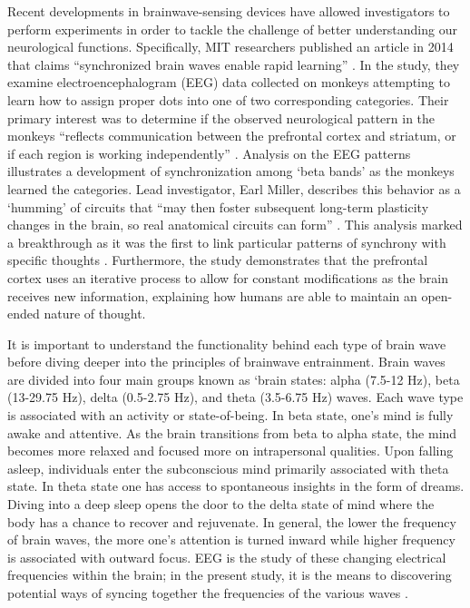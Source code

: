 \documentclass{article}[12pt]
\begin{document}
Recent developments in brainwave-sensing devices have allowed investigators to perform experiments in order to tackle the challenge of better understanding our neurological functions. Specifically, MIT researchers published an article in 2014 that claims ``synchronized brain waves enable rapid learning'' \cite{trafton}. In the study, they examine electroencephalogram (EEG) data collected on monkeys attempting to learn how to assign proper dots into one of two corresponding categories.  Their primary interest was to determine if the observed neurological pattern in the monkeys ``reflects communication between the prefrontal cortex and striatum, or if each region is working independently'' \cite{trafton}. Analysis on the EEG patterns illustrates a development of synchronization among ‘beta bands’ as the monkeys learned the categories. Lead investigator, Earl Miller, describes this behavior as a ‘humming’ of circuits that ``may then foster subsequent long-term plasticity changes in the brain, so real anatomical circuits can form'' \cite{trafton}. This analysis marked a breakthrough as it was the first to link particular patterns of synchrony with specific thoughts \cite{trafton}. Furthermore, the study demonstrates that the prefrontal cortex uses an iterative process to allow for constant modifications as the brain receives new information, explaining how humans are able to maintain an open-ended nature of thought.

It is important to understand the functionality behind each type of brain wave before diving deeper into the principles of brainwave entrainment. Brain waves are divided into four main groups known as ‘brain states: alpha (7.5-12 Hz), beta (13-29.75 Hz), delta (0.5-2.75 Hz), and theta (3.5-6.75 Hz) waves. Each wave type is associated with an activity or state-of-being. In beta state, one's mind is fully awake and attentive. As the brain transitions from beta to alpha state, the mind becomes more relaxed and focused more on intrapersonal qualities. Upon falling asleep, individuals enter the subconscious mind primarily associated with theta state. In theta state one has access to spontaneous insights in the form of dreams.  Diving into a deep sleep opens the door to the delta state of mind where the body has a chance to recover and rejuvenate.
In general, the lower the frequency of brain waves, the more one's attention is turned inward while higher frequency is associated with outward focus. EEG is the study of these changing electrical frequencies within the brain; in the present study, it is the means to discovering potential ways of syncing together the frequencies of the various waves \cite{Giorgio}.  
\end{document}
